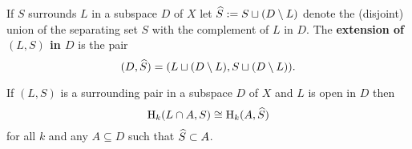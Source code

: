 \documentclass[12pt]{article}
\begin{document}

\begin{definition}[Extension]
  If $S$ surrounds $L$ in a subspace $D$ of $X$ let $\widehat{S} := S\sqcup (D\setminus L)$ denote the (disjoint) union of the separating set $S$ with the complement of $L$ in $D$.
  The \textbf{extension of $(L, S)$ in $D$} is the pair
  \[ (D, \widehat{S}) = (L\sqcup (D\setminus L), S\sqcup (D\setminus L)).\]
\end{definition}

\begin{lemma}\label{lem:excision}
  If $(L, S)$ is a surrounding pair in a subspace $D$ of $X$ and $L$ is open in $D$ then
  \[ \mathrm{H}_k(L\cap A, S) \cong \mathrm{H}_k(A, \widehat{S}) \]
  for all $k$ and any $A\subseteq D$ such that $\widehat{S}\subset A$.
\end{lemma}

\clearpage
\end{document}
